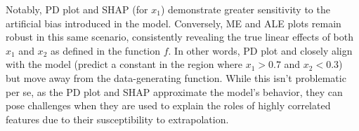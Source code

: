 Notably, \gls{PD} plot and \gls{SHAP} (for \(x_1\)) demonstrate greater sensitivity to the artificial bias introduced in the model. Conversely, \gls{ME} and \gls{ALE} plots remain robust in this same scenario, consistently revealing the true linear effects of both $x_1$ and $x_2$ as defined in the function \(f\).  In other words, \gls{PD} plot and  closely align with the model (predict a constant in the region where $x_1 > 0.7$ and $x_2 <0.3 $) but move away from the data-generating function. While this isn't problematic per se, as the \gls{PD} plot and \gls{SHAP} approximate the model's behavior, they can pose challenges when they are used to explain the roles of highly correlated features due to their susceptibility to extrapolation.






